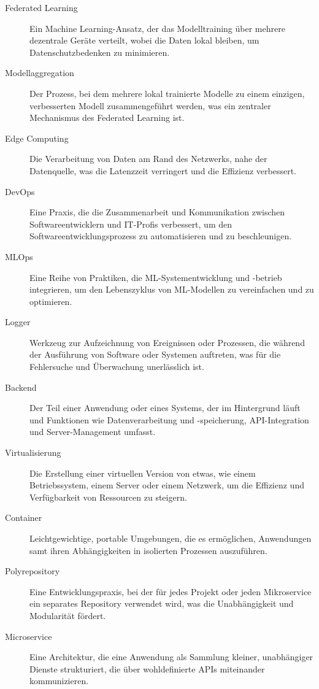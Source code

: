 \documentclass[11pt]{article}
\begin{document}
\begin{description}
\item[Federated Learning] Ein Machine Learning-Ansatz, der das Modelltraining über mehrere dezentrale Geräte verteilt, wobei die Daten lokal bleiben, um Datenschutzbedenken zu minimieren.
\item[Modellaggregation] Der Prozess, bei dem mehrere lokal trainierte Modelle zu einem einzigen, verbesserten Modell zusammengeführt werden, was ein zentraler Mechanismus des Federated Learning ist.
\item[Edge Computing] Die Verarbeitung von Daten am Rand des Netzwerks, nahe der Datenquelle, was die Latenzzeit verringert und die Effizienz verbessert.
\item[DevOps] Eine Praxis, die die Zusammenarbeit und Kommunikation zwischen Softwareentwicklern und IT-Profis verbessert, um den Softwareentwicklungsprozess zu automatisieren und zu beschleunigen.
\item[MLOps] Eine Reihe von Praktiken, die ML-Systementwicklung und -betrieb integrieren, um den Lebenszyklus von ML-Modellen zu vereinfachen und zu optimieren.
\item[Logger] Werkzeug zur Aufzeichnung von Ereignissen oder Prozessen, die während der Ausführung von Software oder Systemen auftreten, was für die Fehlersuche und Überwachung unerlässlich ist.
\item[Backend] Der Teil einer Anwendung oder eines Systems, der im Hintergrund läuft und Funktionen wie Datenverarbeitung und -speicherung, API-Integration und Server-Management umfasst.
\item[Virtualisierung] Die Erstellung einer virtuellen Version von etwas, wie einem Betriebssystem, einem Server oder einem Netzwerk, um die Effizienz und Verfügbarkeit von Ressourcen zu steigern.
\item[Container] Leichtgewichtige, portable Umgebungen, die es ermöglichen, Anwendungen samt ihren Abhängigkeiten in isolierten Prozessen auszuführen.
\item[Polyrepository] Eine Entwicklungspraxis, bei der für jedes Projekt oder jeden Mikroservice ein separates Repository verwendet wird, was die Unabhängigkeit und Modularität fördert.
\item[Microservice] Eine Architektur, die eine Anwendung als Sammlung kleiner, unabhängiger Dienste strukturiert, die über wohldefinierte APIs miteinander kommunizieren.
\end{description}

\newpage
\end{document}
